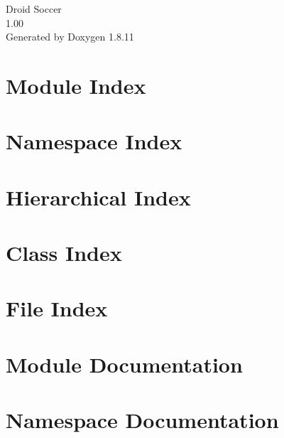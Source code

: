\documentclass[twoside]{book}
\newcommand{\+}{\discretionary{\mbox{\scriptsize$\hookleftarrow$}}{}{}}
\newcommand{\clearemptydoublepage}{%
  \newpage{\pagestyle{empty}\cleardoublepage}%
}
\begin{document}
\hypersetup{pageanchor=false,
             bookmarksnumbered=true,
             pdfencoding=unicode
            }
\begin{titlepage}
\vspace*{7cm}
\begin{center}%
{\Large Droid Soccer \\[1ex]\large 1.\+00 }\\
\vspace*{1cm}
{\large Generated by Doxygen 1.8.11}\\
\end{center}
\end{titlepage}
\clearemptydoublepage
\tableofcontents
\clearemptydoublepage
{}
\hypersetup{pageanchor=true}

\chapter{Module Index}

\chapter{Namespace Index}

\chapter{Hierarchical Index}

\chapter{Class Index}

\chapter{File Index}

\chapter{Module Documentation}


\chapter{Namespace Documentation}











\end{document}
